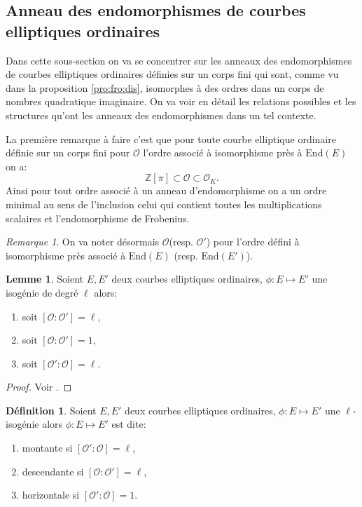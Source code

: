 \documentclass[10pt,a4paper]{book}
\theoremstyle{plain}
\theoremstyle{definition}
\theoremstyle{definition}
\newtheorem{lem}[thm]{Lemme}
\theoremstyle{definition}
\theoremstyle{definition}
\theoremstyle{definition}
\newtheorem{defi}[thm]{Définition}
\theoremstyle{remark}
\newtheorem{rem}[thm]{Remarque}
\theoremstyle{remark}
\theoremstyle{definition}
\begin{document}
\subsection{Anneau des endomorphismes de courbes elliptiques ordinaires}
Dans cette sous-section on va se concentrer sur les anneaux des endomorphismes 
de courbes elliptiques ordinaires définies sur un corps fini qui sont, comme vu
dans la proposition \ref{pro:fro:dis}, isomorphes à des ordres dans un corps de
nombres quadratique imaginaire. On va voir en détail les relations possibles et
les structures qu'ont les anneaux des endomorphismes dans un tel contexte.

La première remarque à faire c'est que pour toute courbe elliptique ordinaire définie sur un corps fini pour $\mathcal{O}$ l'ordre associé à isomorphisme près à $\mathrm{End}(E)$ on a: 
\[
\mathbb{Z}[\pi] \subset \mathcal{O} \subset \mathcal{O}_K.
\]
Ainsi pour tout ordre associé à un anneau d'endomorphisme on a un ordre minimal
au sens de l'inclusion celui qui contient toutes les multiplications scalaires 
et l'endomorphisme de Frobenius.

\begin{rem}
On va noter désormais $\mathcal{O}$(resp. $\mathcal{O}'$) pour l'ordre défini à isomorphisme près associé à $\mathrm{End}(E)$ (resp. $\mathrm{End}(E')$).
\end{rem}

\begin{lem}
Soient $E,E'$ deux courbes elliptiques ordinaires, $\phi: E \mapsto E'$ une isogénie de degré $\ell$ alors:
\begin{enumerate}
\item soit $[\mathcal{O} : \mathcal{O'}]=\ell$, 
\item soit $[\mathcal{O} : \mathcal{O'}]=1$,
\item soit $[\mathcal{O'} : \mathcal{O}]=\ell$.
\end{enumerate}
\end{lem}

\begin{proof}
Voir \cite[Proposition 21]{Kohel96}.
\end{proof}

\begin{defi}
\label{def:iso:nom}
Soient $E,E'$ deux courbes elliptiques ordinaires, $\phi: E \mapsto E'$ une $\ell$-isogénie alors $\phi: E \mapsto E'$ est dite:
\begin{enumerate}
\item montante si $[\mathcal{O'} : \mathcal{O}]=\ell$,
\item descendante si $[\mathcal{O} : \mathcal{O'}]=\ell$,
\item horizontale si $[\mathcal{O'} : \mathcal{O}]=1$.
\end{enumerate}
\end{defi}
\end{document}
